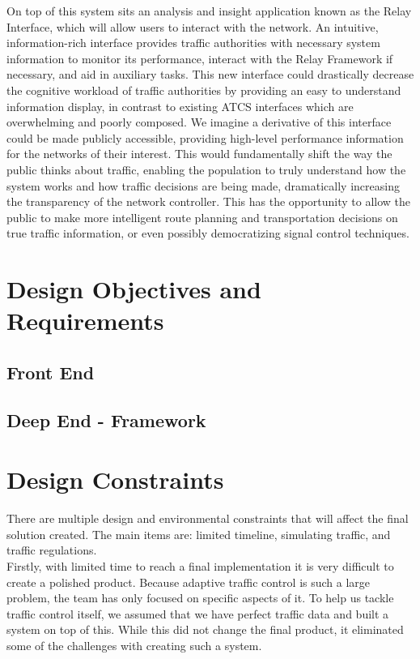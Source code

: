 \documentclass{report}
\begin{document}
On top of this system sits an analysis and insight application known as the Relay Interface, which will allow users to interact with the network.
An intuitive, information-rich interface provides traffic authorities with necessary system information to monitor its performance, interact with the Relay Framework if necessary, and aid in auxiliary tasks.
This new interface could drastically decrease the cognitive workload of traffic authorities by providing an easy to understand information display, in contrast to existing ATCS interfaces which are overwhelming and poorly composed.
We imagine a derivative of this interface could be made publicly accessible, providing high-level performance information for the networks of their interest.
This would fundamentally shift the way the public thinks about traffic, enabling the population to truly understand how the system works and how traffic decisions are being made, dramatically increasing the transparency of the network controller.
This has the opportunity to allow the public to make more intelligent route planning and transportation decisions on true traffic information, or even possibly democratizing signal control techniques.

\section{Design Objectives and Requirements}
\subsection{Front End}
\subsection{Deep End - Framework}

\section{Design Constraints}
There are multiple design and environmental constraints that will affect the final solution created.
The main items are: limited timeline, simulating traffic, and traffic regulations.\\

Firstly, with limited time to reach a final implementation it is very difficult to create a polished product.
Because adaptive traffic control is such a large problem, the team has only focused on specific aspects of it.
To help us tackle traffic control itself, we assumed that we have perfect traffic data and built a system on top of this.
While this did not change the final product, it eliminated some of the challenges with creating such a system.\\
\end{document}
